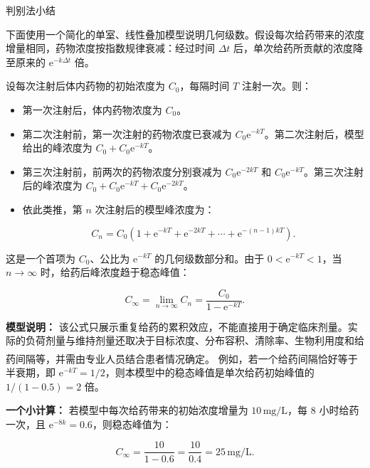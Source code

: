 \documentclass[aspectratio=169,10pt,fontset=fandol]{ctexbeamer}
\newcommand{\ee}{\mathrm{e}}
\newcommand{\upcite}[1]{\textsuperscript{\textsuperscript{\cite{#1}}}}
\begin{document}
\begin{frame}[t,fragile]{判别法小结}
\normalsize
{\normalsize
\begin{application}



下面使用一个简化的单室、线性叠加模型说明几何级数。假设每次给药带来的浓度增量相同，药物浓度按指数规律衰减：经过时间 \(\Delta t\) 后，单次给药所贡献的浓度降至原来的 \(\ee^{-k\Delta t}\) 倍。



设每次注射后体内药物的初始浓度为 \(C_0\)，每隔时间 \(T\) 注射一次。则：

\begin{itemize}

\item 第一次注射后，体内药物浓度为 \(C_0\)。

\item 第二次注射前，第一次注射的药物浓度已衰减为 \(C_0\ee^{-kT}\)。第二次注射后，模型给出的峰浓度为 \(C_0+C_0\ee^{-kT}\)。

\item 第三次注射前，前两次的药物浓度分别衰减为 \(C_0\ee^{-2kT}\) 和 \(C_0\ee^{-kT}\)。第三次注射后的峰浓度为 \(C_0+C_0\ee^{-kT}+C_0\ee^{-2kT}\)。

\item 依此类推，第 \(n\) 次注射后的模型峰浓度为：

\[

C_n=C_0\left(1+\ee^{-kT}+\ee^{-2kT}+\cdots+\ee^{-(n-1)kT}\right).

\]

\end{itemize}



这是一个首项为 \(C_0\)、公比为 \(\ee^{-kT}\) 的几何级数部分和。由于 \(0<\ee^{-kT}<1\)，当 \(n\to\infty\) 时，给药后峰浓度趋于稳态峰值：

\[

C_{\infty}=\lim_{n\to\infty}C_n=\frac{C_0}{1-\ee^{-kT}}.

\]



\textbf{模型说明：} 该公式只展示重复给药的累积效应，不能直接用于确定临床剂量。实际的负荷剂量与维持剂量还取决于目标浓度、分布容积、清除率、生物利用度和给药间隔等，并需由专业人员结合患者情况确定。\upcite{NCBISteadyState} 例如，若一个给药间隔恰好等于半衰期，即 \(\ee^{-kT}=1/2\)，则本模型中的稳态峰值是单次给药初始峰值的 \(1/(1-0.5)=2\) 倍。



\textbf{一个小计算：} 若模型中每次给药带来的初始浓度增量为 \(10\,\text{mg/L}\)，每 8 小时给药一次，且 \(\ee^{-8k}=0.6\)，则稳态峰值为：

\[

C_{\infty} = \frac{10}{1 - 0.6} = \frac{10}{0.4} = 25\,\text{mg/L}.

\]

\end{application}
}
\end{frame}
\end{document}
